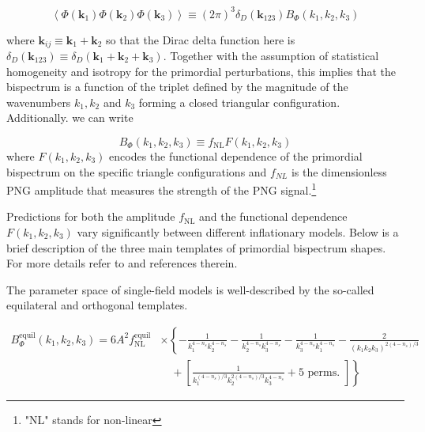 \begin{equation}
    \left\langle\Phi\left(\mathbf{k}_{1}\right) \Phi\left(\mathbf{k}_{2}\right) \Phi\left(\mathbf{k}_{3}\right)\right\rangle \equiv(2 \pi)^{3} \delta_{D}\left(\mathbf{k}_{123}\right) B_{\Phi}\left(k_{1}, k_{2}, k_{3}\right) \label{eq:1.229}
\end{equation}

where  $\mathbf{k}_{i j} \equiv \mathbf{k}_{1}+\mathbf{k}_{2}$ so that the Dirac delta function here is $\delta_{D}\left(\mathbf{k}_{123}\right) \equiv \delta_{D}\left(\mathbf{k}_{1}+\mathbf{k}_{2}+\mathbf{k}_{3}\right)$. 
Together with the assumption of statistical homogeneity and isotropy for the primordial perturbations, this implies that the bispectrum is a function of the triplet defined by the magnitude of the wavenumbers $k_{1}, k_{2}$ and $k_{3}$ forming a closed triangular configuration.
Additionally. we can write

\begin{equation}
    B_{\Phi}\left(k_{1}, k_{2}, k_{3}\right) \equiv f_{\mathrm{NL}} F\left(k_{1}, k_{2}, k_{3}\right) \label{eq:1.230}
\end{equation}
where $F\left(k_{1}, k_{2}, k_{3}\right)$ encodes the functional dependence of the primordial bispectrum on the specific triangle configurations and $f_{NL}$ is the dimensionless PNG amplitude that measures the strength of the PNG signal.\footnote{"NL" stands for non-linear}

Predictions for both the amplitude $f_{\mathrm{NL}}$ and the functional dependence $F\left(k_{1}, k_{2}, k_{3}\right)$ vary significantly between different inflationary models. Below is a brief description of the three main templates of primordial bispectrum shapes. For more details refer to \cite{meerburg2019primordialnongaussianity} and references therein.

The parameter space of single-field models is well-described by the so-called equilateral and orthogonal templates.\cite{creminelli2006JCAP...05..004C, Chen_2007}


\begin{equation}
\begin{aligned}
    B_{\Phi}^{\text{equil}}\left(k_1, k_2, k_3\right) = 6 A^2 f_{\mathrm{NL}}^{\text{equil}} & \times\left\{-\frac{1}{k_1^{4-n_s} k_2^{4-n_s}} - \frac{1}{k_2^{4-n_s} k_3^{4-n_s}} - \frac{1}{k_3^{4-n_s} k_1^{4-n_s}} - \frac{2}{\left(k_1 k_2 k_3\right)^{2\left(4-n_s\right) / 3}}\right. \\
    & \left.\quad + \left[\frac{1}{k_1^{\left(4-n_s\right) / 3} k_2^{2\left(4-n_s\right) / 3} k_3^{4-n_s}} + 5 \text{ perms. }\right]\right\}
\end{aligned}
\label{eq:1.231}
\end{equation}

